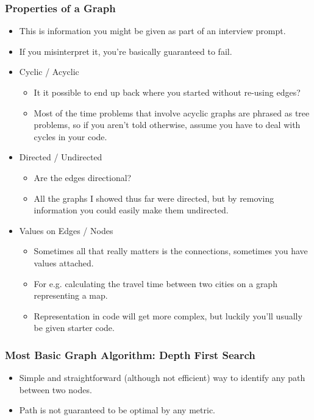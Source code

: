 \documentclass[aspectratio=169]{beamer}
\begin{document}
\begin{frame}
    \frametitle{Properties of a Graph}
    \begin{itemize}
        \item This is information you might be given as part of an interview prompt.
        \item If you misinterpret it, you're basically guaranteed to fail.
        \pause
        \item Cyclic / Acyclic
        \begin{itemize}
            \item It it possible to end up back where you started without re-using edges?
            \item Most of the time problems that involve acyclic graphs are phrased as tree problems,
                  so if you aren't told otherwise, assume you have to deal with cycles in your code.
        \end{itemize}
        \pause
        \item Directed / Undirected
        \begin{itemize}
            \item Are the edges directional?
            \item All the graphs I showed thus far were directed, but by removing
                  information you could easily make them undirected.
        \end{itemize}
        \pause
        \item Values on Edges / Nodes
        \begin{itemize}
            \item Sometimes all that really matters is the connections, sometimes you have values attached.
            \item For e.g. calculating the travel time between two cities on a graph representing a map.
            \item Representation in code will get more complex, but luckily you'll usually be given starter code.
        \end{itemize}
    \end{itemize}
\end{frame}
\begin{frame}
    \frametitle{Most Basic Graph Algorithm: Depth First Search}
    \begin{itemize}
        \item Simple and straightforward (although not efficient) way to
        identify any path between two nodes.
        \item Path is not guaranteed to be optimal by any metric.
    \end{itemize}
    

\end{frame}
\end{document}
